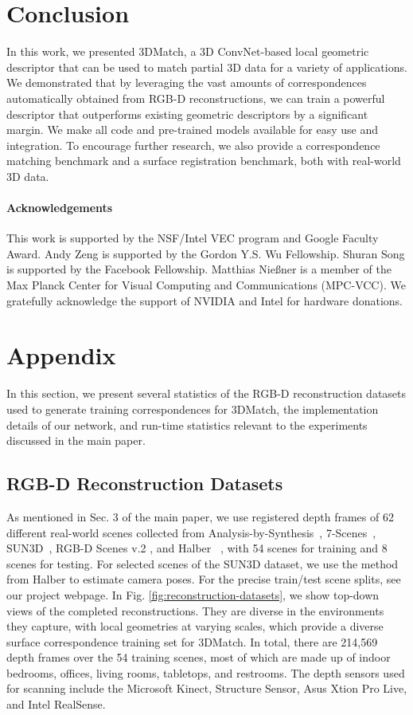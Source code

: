 \documentclass[10pt,twocolumn,letterpaper]{article}
\newcommand{\mypara}{\vspace*{-3mm}\paragraph}
\begin{document}
\section{Conclusion}
In this work, we presented 3DMatch, a 3D ConvNet-based local geometric descriptor that can be used to match partial 3D data for a variety of applications. 
We demonstrated that by leveraging the vast amounts of correspondences automatically obtained from RGB-D reconstructions, we can train a powerful descriptor that outperforms existing geometric descriptors by a significant margin.
We make all code and pre-trained models available for easy use and integration. To encourage further research, we also provide a correspondence matching benchmark and a surface registration benchmark, both with real-world 3D data. 


\mypara{Acknowledgements} 
This work is supported by the NSF/Intel VEC program and Google Faculty Award.
Andy Zeng is supported by the Gordon Y.S. Wu Fellowship.
Shuran Song is supported by the Facebook Fellowship.
Matthias Nie{\ss}ner is a member of the Max Planck Center for Visual Computing and Communications (MPC-VCC).
We gratefully acknowledge the support of NVIDIA and Intel for hardware donations.


\appendix

\section{Appendix}

In this section, we present several statistics of the RGB-D reconstruction datasets used to generate training correspondences for 3DMatch, the implementation details of our network, and run-time statistics relevant to the experiments discussed in the main paper.

\subsection{RGB-D Reconstruction Datasets}
As mentioned in Sec. 3 of the main paper, we use registered depth frames of 62 different real-world scenes collected from Analysis-by-Synthesis~\cite{valentin2016learning}, 7-Scenes~\cite{shotton2013scene}, SUN3D~\cite{SUN3D}, RGB-D Scenes v.2 \cite{lai2014unsupervised}, and Halber \etal~\cite{halber2016structured}, with 54 scenes for training and 8 scenes for testing. For selected scenes of the SUN3D dataset, we use the method from Halber \etal to estimate camera poses. For the precise train/test scene splits, see our project webpage. In Fig. \ref{fig:reconstruction-datasets}, we show top-down views of the completed reconstructions. They are diverse in the environments they capture, with local geometries at varying scales, which provide a diverse surface correspondence training set for 3DMatch. In total, there are 214,569 depth frames over the 54 training scenes, most of which are made up of indoor bedrooms, offices, living rooms, tabletops, and restrooms. The depth sensors used for scanning include the Microsoft Kinect, Structure Sensor, Asus Xtion Pro Live, and Intel RealSense.
\end{document}

